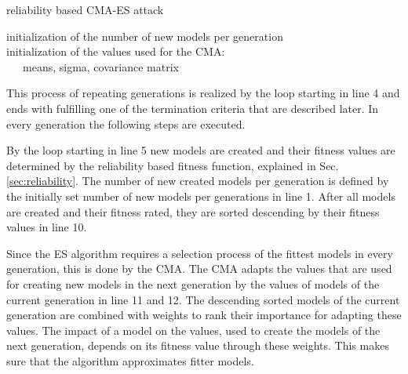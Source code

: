 \SetAlCapHSkip{0.2em}
\begin{algorithm}[H] %
\Indm
\SetAlgoLined
\caption{reliability based \acl{CMA-ES} attack}
\label{alg:cma-es}
\Indp

initialization of the number of new models per generation\\
initialization of the values used for the \ac{CMA}:\\
\ \ \ means, sigma, covariance matrix\\
\end{algorithm}

This process of repeating generations is realized by the loop starting in line 4 and ends with fulfilling one of the termination criteria that are described later.
In every generation the following steps are executed.

By the loop starting in line 5 new models are created and their fitness values are determined by the reliability based fitness function, explained in Sec. \ref{sec:reliability}. %
The number of new created models per generation is defined by the initially set number of new models per generations in line 1.
After all models are created and their fitness rated, they are sorted descending by their fitness values in line 10.

Since the \ac{ES} algorithm requires a selection process of the fittest models in every generation, this is done by the \ac{CMA}.
The \ac{CMA} adapts the values that are used for creating new models in the next generation by the values of models of the current generation in line 11 and 12. %
The descending sorted models of the current generation are combined with weights to rank their importance for adapting these values.
The impact of a model on the values, used to create the models of the next generation, depends on its fitness value through these weights.
This makes sure that the algorithm approximates fitter models.

